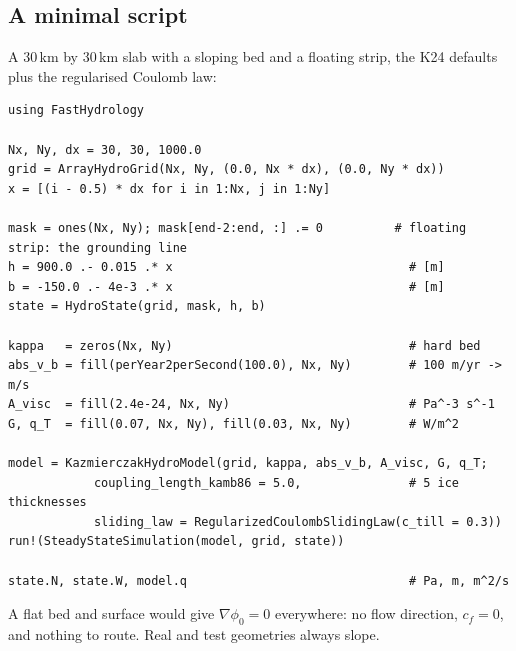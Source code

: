 \subsection{A minimal script}\label{life:example}
A 30\,km by 30\,km slab with a sloping bed and a floating strip, the K24 defaults plus the regularised Coulomb law:
{\small
\begin{verbatim}
using FastHydrology

Nx, Ny, dx = 30, 30, 1000.0
grid = ArrayHydroGrid(Nx, Ny, (0.0, Nx * dx), (0.0, Ny * dx))
x = [(i - 0.5) * dx for i in 1:Nx, j in 1:Ny]

mask = ones(Nx, Ny); mask[end-2:end, :] .= 0          # floating strip: the grounding line
h = 900.0 .- 0.015 .* x                                 # [m]
b = -150.0 .- 4e-3 .* x                                 # [m]
state = HydroState(grid, mask, h, b)

kappa   = zeros(Nx, Ny)                                 # hard bed
abs_v_b = fill(perYear2perSecond(100.0), Nx, Ny)        # 100 m/yr -> m/s
A_visc  = fill(2.4e-24, Nx, Ny)                         # Pa^-3 s^-1
G, q_T  = fill(0.07, Nx, Ny), fill(0.03, Nx, Ny)        # W/m^2

model = KazmierczakHydroModel(grid, kappa, abs_v_b, A_visc, G, q_T;
            coupling_length_kamb86 = 5.0,               # 5 ice thicknesses
            sliding_law = RegularizedCoulombSlidingLaw(c_till = 0.3))
run!(SteadyStateSimulation(model, grid, state))

state.N, state.W, model.q                               # Pa, m, m^2/s
\end{verbatim}}
A flat bed and surface would give $\nabla\phi_0 = 0$ everywhere: no flow direction, $c_f = 0$, and nothing to route. Real
and test geometries always slope.

